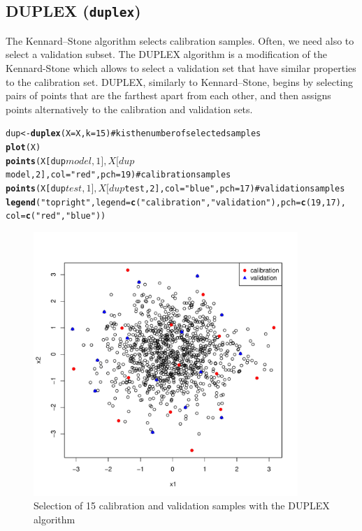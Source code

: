 \documentclass[12pt]{article}\usepackage{graphicx, color}
\makeatletter
\newcommand{\hlfunctioncall}[1]{\textcolor[rgb]{0.501960784313725,0,0.329411764705882}{\textbf{#1}}}%
\newcommand{\hlstring}[1]{\textcolor[rgb]{0.6,0.6,1}{#1}}%
\newcommand{\hlcomment}[1]{\textcolor[rgb]{0.180392156862745,0.6,0.341176470588235}{#1}}%
\newenvironment{kframe}{%
 \def\at@end@of@kframe{}%
 \ifinner\ifhmode%
  \def\at@end@of@kframe{\end{minipage}}%
  \begin{minipage}{\columnwidth}%
 \fi\fi%
 \def\FrameCommand##1{\hskip\@totalleftmargin \hskip-\fboxsep
 \colorbox{shadecolor}{##1}\hskip-\fboxsep
     \hskip-\linewidth \hskip-\@totalleftmargin \hskip\columnwidth}%
 \MakeFramed {\advance\hsize-\width
   \@totalleftmargin\z@ \linewidth\hsize
   \@setminipage}}%
 {\par\unskip\endMakeFramed%
 \at@end@of@kframe}
\newenvironment{knitrout}{}{} %
\newcommand{\Rfunction}[1]{{\texttt{#1}}}
\makeatother
\begin{document}
\subsection{DUPLEX (\Rfunction{duplex})}

The Kennard--Stone algorithm selects calibration samples. Often, we need also to select a validation subset. The DUPLEX algorithm \cite{snee1977} is a modification of the Kennard-Stone which allows to select a validation set that have similar properties to the calibration set. DUPLEX, similarly to Kennard--Stone, begins by selecting pairs of points that are the farthest apart from each other, and then assigns points alternatively to the calibration and validation sets.

\begin{knitrout}
\color{fgcolor}\begin{kframe}
\begin{alltt}
dup <- \hlfunctioncall{duplex}(X = X, k = 15)  \hlcomment{# k is the number of selected samples}
\hlfunctioncall{plot}(X)
\hlfunctioncall{points}(X[dup$model, 1], X[dup$model, 2], col = \hlstring{"red"}, pch = 19)  # calibration samples
\hlfunctioncall{points}(X[dup$test, 1], X[dup$test, 2], col = \hlstring{"blue"}, pch = 17)  # validation samples
\hlfunctioncall{legend}(\hlstring{"topright"}, legend = \hlfunctioncall{c}(\hlstring{"calibration"}, \hlstring{"validation"}), pch = \hlfunctioncall{c}(19, 17), 
    col = \hlfunctioncall{c}(\hlstring{"red"}, \hlstring{"blue"}))
\end{alltt}
\end{kframe}\begin{figure}[]


{\centering \includegraphics[width=10cm,height=10cm]{figure/duplex} 

}

\caption[Selection of 15 calibration and validation samples with the DUPLEX algorithm]{Selection of 15 calibration and validation samples with the DUPLEX algorithm\label{fig:duplex}}
\end{figure}


\end{knitrout}
\end{document}
